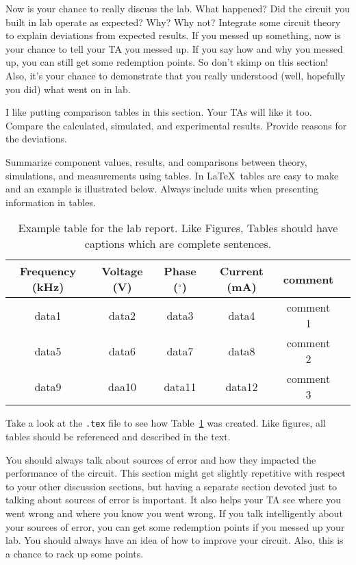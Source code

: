 \documentclass[11pt]{article}
\begin{document}
Now is your chance to really discuss the lab. What happened? Did the circuit you built in lab operate as expected? Why? Why not? Integrate some circuit theory to explain deviations from expected results. If you messed up something, now is your chance to tell your TA you messed up. If you say how and why you messed up, you can still get some redemption points. So don’t skimp on this section! Also, it’s your chance to demonstrate that you really understood (well, hopefully you did) what went on in lab.

I like putting comparison tables in this section. Your TAs will like it too. Compare the calculated, simulated, and experimental results. Provide reasons for the deviations.

Summarize component values, results, and comparisons between theory, simulations, and measurements using tables.  In \LaTeX\, tables are easy to make and an example is illustrated below.  Always include units when presenting information in tables.

\begin{table}[ht]
\centering
\begin{tabular}{ |c|c|c|c|c|p{2in}| } 
 \hline\hline
 Frequency (kHz) & Voltage (V) & Phase ($^\circ$) & Current (mA) & comment  \\\hline\hline 
 data1 & data2 & data3 & data4 & comment 1 \\ \hline
 data5 & data6 & data7 & data8 & comment 2\\ \hline
 data9  & daa10 & data11 & data12 & comment 3\\ 
 \hline\hline
\end{tabular}
\caption{Example table for the lab report. Like Figures, Tables should have captions which are complete sentences.}
\label{table_ex}
\end{table}

Take a look at the {\tt .tex} file to see how Table~\ref{table_ex} was created. Like figures, all tables should be referenced and described in the text.

You should always talk about sources of error and how they impacted the performance of the circuit. This section might get slightly repetitive with respect to your other discussion sections, but having a separate section devoted just to talking about sources of error is important. It also helps your TA see where you went wrong and where you know you went wrong. If you talk intelligently about your sources of error, you can get some redemption points if you messed up your lab. You should always have an idea of how to improve your circuit. Also, this is a chance to rack up some points.
\end{document}
